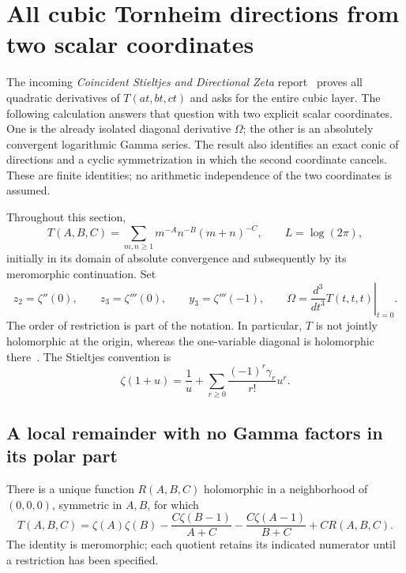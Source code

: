 \section{All cubic Tornheim directions from two scalar coordinates}
\label{tr3:section}

The incoming \emph{Coincident Stieltjes and Directional Zeta} report~\cite{tr3:incoming} proves
all quadratic derivatives of $T(at,bt,ct)$ and asks for the entire cubic
layer.  The following calculation answers that question with two explicit
scalar coordinates.  One is the already isolated diagonal derivative
$\Omega$; the other is an absolutely convergent logarithmic Gamma series.
The result also identifies an exact conic of directions and a cyclic
symmetrization in which the second coordinate cancels.  These are finite
identities; no arithmetic independence of the two coordinates is assumed.

Throughout this section,
\[
 T(A,B,C)=\sum_{m,n\geq1}m^{-A}n^{-B}(m+n)^{-C},
 \qquad L=\log(2\pi),
\]
initially in its domain of absolute convergence and subsequently by its
meromorphic continuation.  Set
\[
 z_2=\zeta''(0),\qquad z_3=\zeta'''(0),\qquad
 y_3=\zeta'''(-1),\qquad
 \Omega=\left.\frac{d^3}{dt^3}T(t,t,t)\right|_{t=0}.
\]
The order of restriction is part of the notation.  In particular, $T$ is
not jointly holomorphic at the origin, whereas the one-variable diagonal
is holomorphic there~\cite{tr3:BD}.  The Stieltjes convention is
\[
 \zeta(1+u)=\frac1u+\sum_{r\geq0}\frac{(-1)^r\gamma_r}{r!}u^r.
\]

\subsection{A local remainder with no Gamma factors in its polar part}

\begin{lemma}\label{tr3:polar}
There is a unique function $R(A,B,C)$ holomorphic in a neighborhood of
$(0,0,0)$, symmetric in $A,B$, for which
\begin{equation}\label{tr3:model}
 \boxed{\displaystyle
 T(A,B,C)=\zeta(A)\zeta(B)
  -\frac{C\zeta(B-1)}{A+C}
  -\frac{C\zeta(A-1)}{B+C}+C R(A,B,C).}
\end{equation}
The identity is meromorphic; each quotient retains its indicated
numerator until a restriction has been specified.
\end{lemma}

